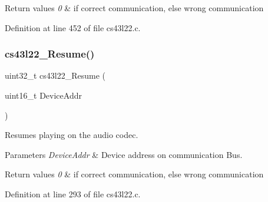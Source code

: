 \begin{DoxyRetVals}{Return values}
{\em 0} & if correct communication, else wrong communication \\
\hline
\end{DoxyRetVals}


Definition at line 452 of file cs43l22.\+c.

\mbox{\label{group___c_s43_l22___exported___functions_ga579c0ef6455060e9117632f8d83d606a}} 
\subsubsection{\texorpdfstring{cs43l22\+\_\+\+Resume()}{cs43l22\_Resume()}}
{\footnotesize\ttfamily uint32\+\_\+t cs43l22\+\_\+\+Resume (\begin{DoxyParamCaption}\item[{uint16\+\_\+t}]{Device\+Addr }\end{DoxyParamCaption})}



Resumes playing on the audio codec. 


\begin{DoxyParams}{Parameters}
{\em Device\+Addr} & Device address on communication Bus. \\
\hline
\end{DoxyParams}

\begin{DoxyRetVals}{Return values}
{\em 0} & if correct communication, else wrong communication \\
\hline
\end{DoxyRetVals}


Definition at line 293 of file cs43l22.\+c.

\mbox{\label{group___c_s43_l22___exported___functions_ga1ea4920e35f5e5f903870a50b53bc719}} 
